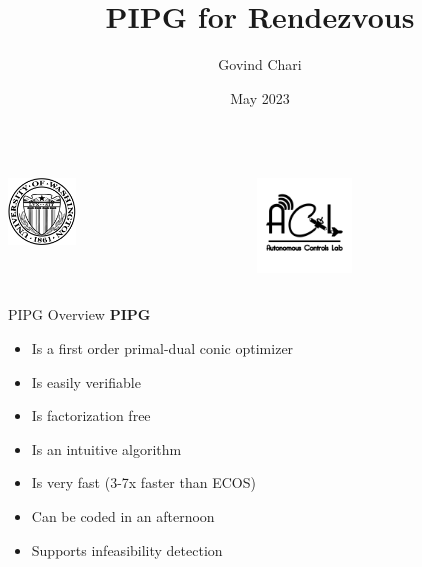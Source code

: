 \documentclass[aspectratio=169]{beamer}
\title{PIPG for Rendezvous}
\author{Govind Chari}
\date{May 2023}
\institute{Univeristy of Washington}
\begin{document}
\begin{frame}
\titlepage
\begin{columns}
\begin{column}[c]{0.5\linewidth}
\begin{center}
\includegraphics[width=1.8cm]{img/seal_black.pdf}
\end{center}
\end{column}
\begin{column}[c]{0.5\linewidth}
\begin{center}
    \vspace{0.25cm}
\includegraphics[height=2.5cm]{img/ACL_logo.png}    
\end{center}
\end{column}
\end{columns}
\end{frame}

\logo{}

\begin{frame}{PIPG Overview}
    \textbf{PIPG}
    \begin{itemize}
        \item Is a first order primal-dual conic optimizer
        \item Is easily verifiable
        \item Is factorization free
        \item Is an intuitive algorithm
        \item Is very fast (3-7x faster than ECOS)
        \item Can be coded in an afternoon
        \item Supports infeasibility detection
    \end{itemize}
\end{frame}
\end{document}
